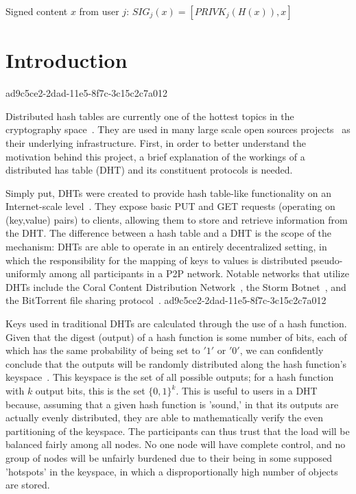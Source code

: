 \documentclass[12pt]{article}
\begin{document}
Signed content $x$ from user $j$: $SIG_j(x) = \left[ PRIVK_j( H(x) ), x \right]$

\section{Introduction}
ad9c5ce2-2dad-11e5-8f7c-3c15c2c7a012\par Distributed hash tables are currently one of the hottest topics in the cryptography space~\cite{Stoica:2001dj,Rowstron:2001ea,Ratnasamy:2001wn}. They are used in many large scale open sources projects~\cite{Freitas:2013tb,Xu:2010vs,Perfitt:2010fh} as their underlying infrastructure. First, in order to better understand the motivation behind this project, a brief explanation of the workings of a distributed has table (DHT) and its constituent protocols is needed.

\par Simply put, DHTs were created to provide hash table-like functionality on an Internet-scale level~\cite{Ratnasamy:2001wn}. They expose basic PUT and GET requests (operating on (key,value) pairs) to clients, allowing them to store and retrieve information from the DHT. The difference between a hash table and a DHT is the scope of the mechanism: DHTs are able to operate in an entirely decentralized setting, in which the responsibility for the mapping of keys to values is distributed pseudo-uniformly among all participants in a P2P network. Notable networks that utilize DHTs include the Coral Content Distribution Network~\cite{Freedman:2004vb}, the Storm Botnet~\cite{Holz:2008uk}, and the BitTorrent file sharing protocol~\cite{Cohen:y1_8mBnw}.
ad9c5ce2-2dad-11e5-8f7c-3c15c2c7a012
\par Keys used in traditional DHTs are calculated through the use of a hash function. Given that the digest (output) of a hash function is some number of bits, each of which has the same probability of being set to $'1'$ or $'0'$, we can confidently conclude that the outputs will be randomly distributed along the hash function's keyspace~. This keyspace is the set of all possible outputs; for a hash function with $k$ output bits, this is the set $\{0,1\}^k$. This is useful to users in a DHT because, assuming that a given hash function is 'sound,' in that its outputs are actually evenly distributed, they are able to mathematically verify the even partitioning of the keyspace. The participants can thus trust that the load will be balanced fairly among all nodes. No one node will have complete control, and no group of nodes will be unfairly burdened due to their being in some supposed 'hotspots' in the keyspace, in which a disproportionally high number of objects are stored.~
\end{document}
